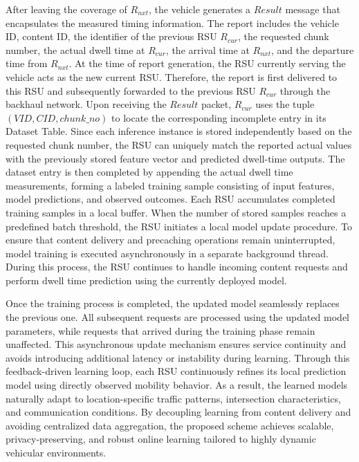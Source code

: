 \documentclass[journal]{IEEEtran}
\begin{document}
After leaving the coverage of $R_{nxt}$, the vehicle generates a \(Result\) message that encapsulates the measured timing information.
The report includes the vehicle ID, content ID, the identifier of the previous RSU $R_{cur}$, the requested chunk number, the actual dwell time at $R_{cur}$, the arrival time at $R_{nxt}$, and the departure time from $R_{nxt}$.
At the time of report generation, the RSU currently serving the vehicle acts as the new current RSU.
Therefore, the report is first delivered to this RSU and subsequently forwarded to the previous RSU $R_{cur}$ through the backhaul network.
Upon receiving the \(Result\) packet, $R_{cur}$ uses the tuple $(VID, CID, chunk\_no)$ to locate the corresponding incomplete entry in its Dataset Table.
Since each inference instance is stored independently based on the requested chunk number, the RSU can uniquely match the reported actual values with the previously stored feature vector and predicted dwell-time outputs.
The dataset entry is then completed by appending the actual dwell time measurements, forming a labeled training sample consisting of input features, model predictions, and observed outcomes.
Each RSU accumulates completed training samples in a local buffer.
When the number of stored samples reaches a predefined batch threshold, the RSU initiates a local model update procedure.
To ensure that content delivery and precaching operations remain uninterrupted, model training is executed asynchronously in a separate background thread.
During this process, the RSU continues to handle incoming content requests and perform dwell time prediction using the currently deployed model.

Once the training process is completed, the updated model seamlessly replaces the previous one.
All subsequent requests are processed using the updated model parameters, while requests that arrived during the training phase remain unaffected.
This asynchronous update mechanism ensures service continuity and avoids introducing additional latency or instability during learning.
Through this feedback-driven learning loop, each RSU continuously refines its local prediction model using directly observed mobility behavior.
As a result, the learned models naturally adapt to location-specific traffic patterns, intersection characteristics, and communication conditions.
By decoupling learning from content delivery and avoiding centralized data aggregation, the proposed scheme achieves scalable, privacy-preserving, and robust online learning tailored to highly dynamic vehicular environments.
\end{document}
